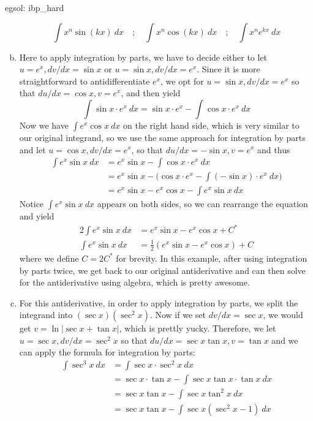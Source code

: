 \begin{egsol}[]{egsol: ibp_hard}
\begin{enumerate}[a)]
        \[\int x^n\sin(kx)~dx \quad;\quad \int x^n\cos(kx)~dx \quad;\quad \int x^ne^{kx}~dx\]
        \item Here to apply integration by parts, we have to decide either to let $u = e^x, dv/dx = \sin x$ or $u = \sin x, dv/dx = e^x$.  Since it is more straightforward to antidifferentiate $e^x$, we opt for $u = \sin x, dv/dx = e^x$ so that $du/dx = \cos x, v = e^x$, and then yield
        \[\int \sin x \cdot e^x~dx = \sin x \cdot e^x - \int \cos x \cdot e^x~dx\]
        Now we have $\int e^x \cos x~dx$ on the right hand side, which is very similar to our original integrand, so we use the same approach for integration by parts and let $u = \cos x, dv/dx = e^x$, so that $du/dx = -\sin x, v = e^x$ and thus
        \begin{align*}
            \int e^x\sin x~dx &= e^x\sin x - \int \cos x \cdot e^x~dx\\
            &= e^x\sin x - \Big(\cos x \cdot e^x - \int (-\sin x) \cdot e^x~dx\Big)\\
            &= e^x\sin x - e^x\cos x - \int e^x\sin x~dx
        \end{align*}
        Notice $\int e^x\sin x~dx$ appears on both sides, so we can rearrange the equation and yield
        \begin{align*}
            2\int e^x\sin x~dx &= e^x\sin x - e^x\cos x + C^*\\
            \int e^x\sin x~dx &= \frac{1}{2}(e^x\sin x - e^x\cos x) + C
        \end{align*}
        where we define $C = 2C^*$ for brevity.  In this example, after using integration by parts twice, we get back to our original antiderivative and can then solve for the antiderivative using algebra, which is pretty awesome.
        \item For this antiderivative, in order to apply integration by parts, we split the integrand into $(\sec x)(\sec^2 x)$.  Now if we set $dv/dx = \sec x$, we would get $v = \ln|\sec x + \tan x|$, which is prettly yucky.  Therefore, we let $u = \sec x, dv/dx = \sec^2 x$ so that $du/dx = \sec x \tan x, v = \tan x$ and we can apply the formula for integration by parts:
        \begin{align*}
            \int \sec^3 x~dx &= \int \sec x \cdot \sec^2 x~dx\\
            &= \sec x \cdot \tan x - \int \sec x \tan x \cdot \tan x~dx\\
            &= \sec x \tan x - \int \sec x \tan^2 x~dx\\
            &= \sec x \tan x - \int \sec x (\sec^2x - 1)~dx\\

\end{align*}
\end{enumerate}
\end{egsol}
